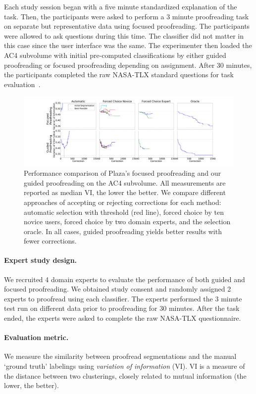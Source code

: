 Each study session began with a five minute standardized explanation of the task. Then, the participants were asked to perform a 3 minute proofreading task on separate but representative data using focused proofreading. The participants were allowed to ask questions during this time. The classifier did not matter in this case since the user interface was the same. The experimenter then loaded the AC4 subvolume with initial pre-computed classifications by either guided proofreading or focused proofreading depending on assignment. After 30 minutes, the participants completed the raw NASA-TLX standard questions for task evaluation~\cite{NASATLX}.
\begin{figure}[t]
\centering
\includegraphics[width=\linewidth]{gfx/ac4trails.pdf}
\caption{Performance comparison of Plaza's focused proofreading and our guided proofreading on the AC4 subvolume. All measurements are reported as median VI, the lower the better. We compare different approaches of accepting or rejecting corrections for each method: automatic selection with threshold (red line), forced choice by ten novice users, forced choice by two domain experts, and the selection oracle. In all cases, guided proofreading yields better results with fewer corrections.}
\label{fig:ac4trails}
\end{figure}

\paragraph{Expert study design.} We recruited 4 domain experts to evaluate the performance of both guided and focused proofreading. We obtained study consent and randomly assigned 2 experts to proofread using each classifier. The experts performed the 3 minute test run on different data prior to proofreading for 30 minutes. After the task ended, the experts were asked to complete the raw NASA-TLX questionnaire.

\paragraph{Evaluation metric.} We measure the similarity between proofread segmentations and the manual `ground truth' labelings using \textit{variation of information} (VI). VI is a measure of the distance between two clusterings, closely related to mutual information (the lower, the better).%

